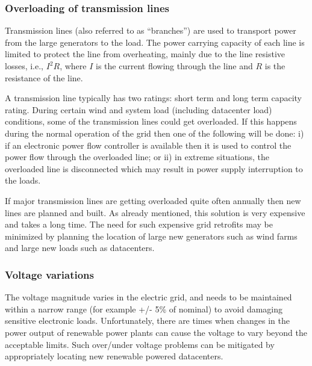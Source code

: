 \subsubsection{Overloading of transmission lines}
Transmission lines (also referred to as ``branches'') are used to transport power from the large generators to the load. The power carrying capacity of each line is limited to protect the line from overheating, mainly due to the line resistive losses, i.e., $I^{2}R$, where $I$ is the current flowing through the line and $R$ is the resistance of the line.

A transmission line typically has two ratings: short term and long term capacity rating. During certain wind and system load (including datacenter load) conditions, some of the transmission lines could get overloaded. If this happens during the normal operation of the grid then one of the following will be done: i) if an electronic power flow controller is available then it is used to control the power flow through the overloaded line; or ii) in extreme situations, the overloaded line is disconnected which may result in power supply interruption to the loads.

If major transmission lines are getting overloaded quite often annually then new lines are planned and built.  As already mentioned, this solution is very expensive and takes a long time. The need for such expensive grid retrofits may be minimized by planning the location of large new generators such as wind farms and large new loads such as datacenters.

\subsubsection{Voltage variations}
The voltage magnitude varies in the electric grid, and needs to be maintained within a narrow range (for example +/- 5\% of nominal) to avoid damaging sensitive electronic loads.  Unfortunately, there are times when changes in the power output of renewable power plants can cause the voltage to vary beyond the acceptable limits. Such over/under voltage problems can be mitigated by appropriately locating new renewable powered datacenters.

